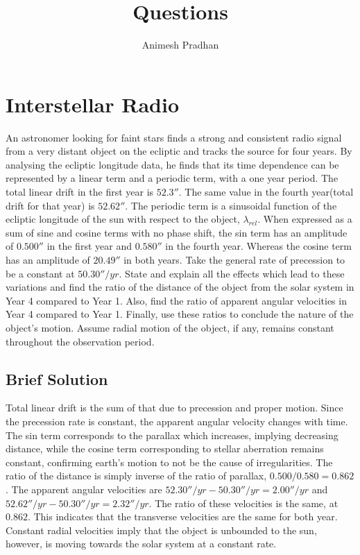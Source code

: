 \documentclass{article}
\title{Questions}
\author{Animesh Pradhan}
\begin{document}
\maketitle
\section{Interstellar Radio}
An astronomer looking for faint stars finds a strong and consistent radio signal from a very distant object on the ecliptic and tracks the source for four years. By analysing the ecliptic longitude data, he finds that its time dependence can be represented by a linear term and a periodic term, with a one year period. The total linear drift in the first year is $52.3''$. The same value in the fourth year(total drift for that year) is $52.62''$. The periodic term is a sinusoidal function of the ecliptic longitude of the sun with respect to the object, $\lambda_{rel}$. When expressed as a sum of sine and cosine terms with no phase shift, the sin term has an amplitude of $0.500''$ in the first year and $0.580''$ in the fourth year. Whereas the cosine term has an amplitude of $20.49''$ in both years. Take the general rate of precession to be a constant at $50.30''/yr$. State and explain all the effects which lead to these variations and find the ratio of the distance of the object from the solar system in Year 4 compared to Year 1. Also, find the ratio of apparent angular velocities in Year 4 compared to Year 1. Finally, use these ratios to conclude the nature of the object's motion. Assume radial motion of the object, if any, remains constant throughout the observation period.

\subsection{Brief Solution}
Total linear drift is the sum of that due to precession and proper motion. Since the precession rate is constant, the apparent angular velocity changes with time. The sin term corresponds to the parallax which increases, implying decreasing distance, while the cosine term corresponding to stellar aberration remains constant, confirming earth's motion to not be the cause of irregularities.  The ratio of the distance is simply inverse of the ratio of parallax, $0.500/0.580 = 0.862$ .
The apparent angular velocities are $52.30''/yr - 50.30''/yr = 2.00''/yr$ and $52.62''/yr - 50.30''/yr = 2.32''/yr$. The ratio of these velocities is the same, at $0.862$. This indicates that the transverse velocities are the same for both year. Constant radial velocities imply that the object is unbounded to the sun, however, is moving towards the solar system at a constant rate.
\end{document}
